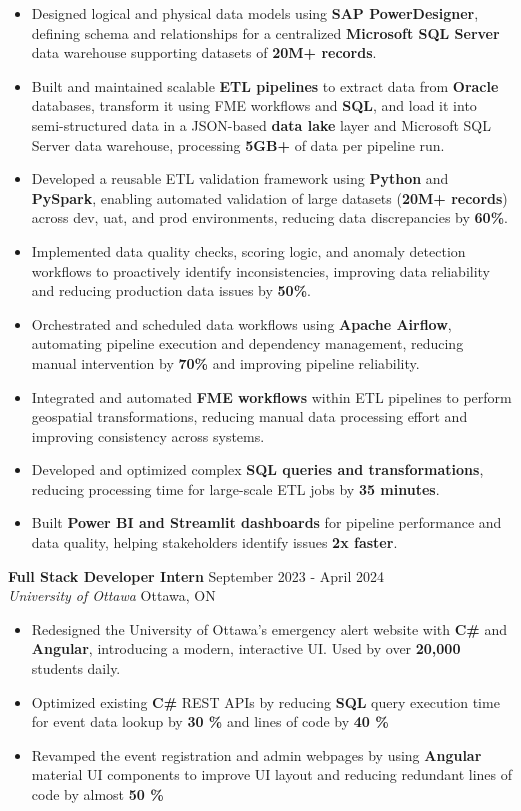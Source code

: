 \documentclass[a4paper]{article}
\begin{document}
\begin{itemize} \itemsep -2pt
\item Designed logical and physical data models using \textbf{SAP PowerDesigner}, defining schema and relationships for a centralized \textbf{Microsoft SQL Server} data warehouse supporting datasets of \textbf{20M+ records}.
\item Built and maintained scalable \textbf{ETL pipelines} to extract data from \textbf{Oracle} databases, transform it using FME workflows and \textbf{SQL}, and load it into semi-structured data in a JSON-based \textbf{data lake} layer and Microsoft SQL Server data warehouse, processing \textbf{5GB+} of data per pipeline run.
\item Developed a reusable ETL validation framework using \textbf{Python} and \textbf{PySpark}, enabling automated validation of large datasets (\textbf{20M+ records}) across dev, uat, and prod environments, reducing data discrepancies by \textbf{60\%}.
\item Implemented data quality checks, scoring logic, and anomaly detection workflows to proactively identify inconsistencies, improving data reliability and reducing production data issues by \textbf{50\%}.
\item Orchestrated and scheduled data workflows using \textbf{Apache Airflow}, automating pipeline execution and dependency management, reducing manual intervention by \textbf{70\%} and improving pipeline reliability.
\item Integrated and automated \textbf{FME workflows} within ETL pipelines to perform geospatial transformations, reducing manual data processing effort and improving consistency across systems.
\item Developed and optimized complex \textbf{SQL queries and transformations}, reducing processing time for large-scale ETL jobs by \textbf{35 minutes}.
\item Built \textbf{Power BI and Streamlit dashboards} for pipeline performance and data quality, helping stakeholders identify issues \textbf{2x faster}.
\end{itemize}
\textbf{Full Stack Developer Intern } \hfill September 2023 - April 2024\\
\textit{University of Ottawa} \hfill Ottawa, ON\\
\vspace{-2mm}
\begin{itemize} \itemsep -2pt
    \item Redesigned the University of Ottawa's emergency alert website with \textbf{C\#} and \textbf{Angular}, introducing a modern, interactive UI. Used by over \textbf{20,000} students daily.
     \item Optimized existing \textbf{C\#} REST APIs by reducing \textbf{SQL} query execution time for event data lookup by \textbf{30 \%} and lines of code by \textbf{40 \%}
    \item Revamped the event registration and admin webpages by using \textbf{Angular} material UI components to improve UI layout and reducing redundant lines of code by almost \textbf{50 \%}
\end{itemize}
\end{document}
